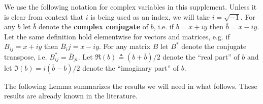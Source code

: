 \documentclass{article}
\theoremstyle{definition}
\begin{document}
We use the following notation for complex variables in this supplement.  Unless it is clear from context that $i$ is being used as an index, we will take $i=\sqrt{-1}$.  For any $b$ let $\overline{b}$ denote the \textbf{complex conjugate} of $b$, i.e. if $b=x+iy$ then $\overline{b}=x-iy$.  Let the same definition hold elementwise for vectors and matrices, e.g. if $B_{ij} = x+iy$ then $\overline{B}_ij = x-iy$. For any matrix $B$ let $B^*$ denote the conjugate transpose, i.e. $B^*_{ij} = \overline{B}_{ji}$.  Let $\Re(b)\triangleq (b+\overline{b})/2$ denote the ``real part'' of $b$ and let $\Im(b) = i(\overline{b}-b)/2$ denote the ``imaginary part'' of $b$.

The following Lemma summarizes the results we will need in what follows.  These results are already known in the literature.
\end{document}
